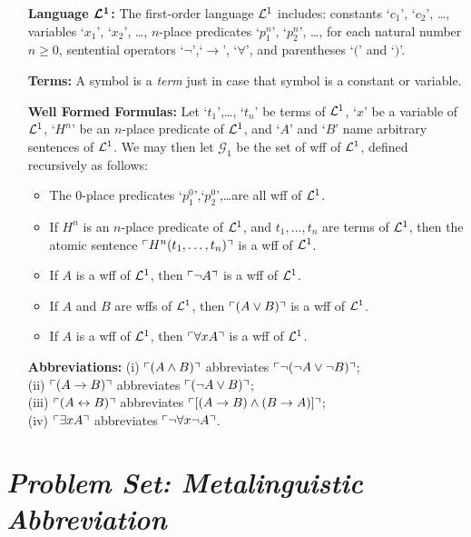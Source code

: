 \documentclass[a4paper, 11pt]{article} %
\begin{document}
\begin{enumerate}[leftmargin=1.2in] %
	\item[\bf Language $\boldsymbol{\mathcal{L}^1}$:] The first-order language $\mathcal{L}^1$ includes: constants `$c_1$', `$c_2$', \dots, variables `$x_1$', `$x_2$', \dots, $n$-place predicates `$p_1^n$', `$p_2^n$', \dots, for each natural number $n\geq0$, sentential operators `$\neg$',`$\rightarrow$', `$\forall$', and parentheses `$($' and `$)$'.
	\item[\bf Terms:] A symbol is a \textit{term} just in case that symbol is a constant or variable.
	\item[\bf Well Formed Formulas:] Let `$t_1$',\dots, `$t_n$' be terms of $\mathcal{L}^1$, `$x$' be a variable of $\mathcal{L}^1$, `$H^n$' be an $n$-place predicate of $\mathcal{L}^1$, and `$A$' and `$B$' name arbitrary sentences of $\mathcal{L}^1$. We may then let $\mathcal{G}_1$ be the set of wff of $\mathcal{L}^1$, defined recursively as follows:
	      \begin{itemize}
		      \item The 0-place predicates `$p_1^0$',`$p_2^0$',\dots are all wff of $\mathcal{L}^1$.
		      \item If ${H^n}$ is an $n$-place predicate of $\mathcal{L}^1$, and ${t_1},\dots,{t_n}$ are terms of $\mathcal{L}^1$, then the atomic sentence $\ulcorner H^n(t_1,\dots,t_n)\urcorner$ is a wff of $\mathcal{L}^1$.
		      \item If ${A}$ is a wff of $\mathcal{L}^1$, then $\ulcorner\neg A\urcorner$ is a wff of $\mathcal{L}^1$.
		      \item If ${A}$ and ${B}$ are wffs of $\mathcal{L}^1$, then $\ulcorner(A\vee B)\urcorner$ is a wff of $\mathcal{L}^1$.
		      \item If ${A}$ is a wff of $\mathcal{L}^1$, then $\ulcorner\forall xA\urcorner$ is a wff of $\mathcal{L}^1$.
	      \end{itemize}
	\item[\bf Abbreviations:] (i) $\ulcorner(A\wedge B)\urcorner$ abbreviates $\ulcorner\neg(\neg A\vee\neg B)\urcorner$;\\ (ii) $\ulcorner(A\rightarrow B)\urcorner$ abbreviates $\ulcorner(\neg A\vee B)\urcorner$;\\ (iii) $\ulcorner(A\leftrightarrow B)\urcorner$ abbreviates $\ulcorner[(A\rightarrow B)\wedge(B\rightarrow A)]\urcorner$;\\ (iv) $\ulcorner\exists xA\urcorner$ abbreviates $\ulcorner\neg\forall x\neg A\urcorner$.
\end{enumerate}



\section*{\it Problem Set: Metalinguistic Abbreviation}
\end{document}
